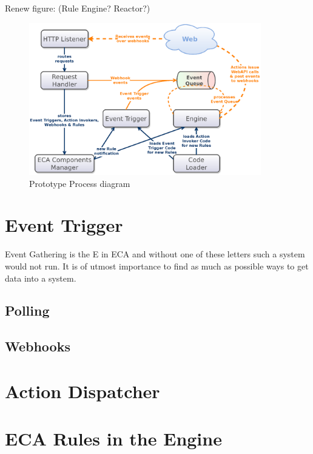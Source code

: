Renew figure: (Rule Engine? Reactor?)
\begin{figure}[!ht]
	\centering
  \includegraphics[width=0.9\textwidth]{figures/Architecture_wET}
	\caption{Prototype Process diagram}
	\label{fig:Architecture_wET}
\end{figure}


\section{Event Trigger}

Event Gathering is the E in ECA and without one of these letters such a system would not run.
It is of utmost importance to find as much as possible ways to get data into a system.



\subsection{Polling}

\subsection{Webhooks}







\section{Action Dispatcher}


\section{ECA Rules in the Engine}

